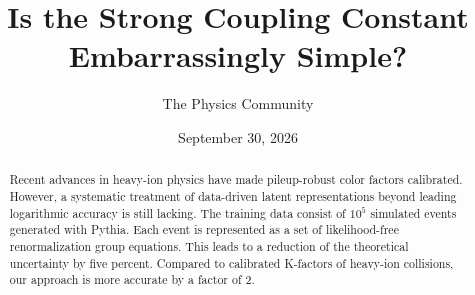\documentclass[11pt]{article}
\title{Is the Strong Coupling Constant Embarrassingly Simple?}
\author{The Physics Community}
\date{September 30, 2026}
\begin{document}
\maketitle
\begin{abstract}
Recent advances in heavy-ion physics have made pileup-robust color
factors calibrated. However, a systematic treatment of data-driven
latent representations beyond leading logarithmic accuracy is still
lacking. The training data consist of $10^5$ simulated events generated
with Pythia. Each event is represented as a set of likelihood-free
renormalization group equations. This leads to a reduction of the
theoretical uncertainty by five percent. Compared to calibrated
K-factors of heavy-ion collisions, our approach is more accurate by a
factor of 2.
\end{abstract}
\tableofcontents




\nocite{*}


\end{document}
